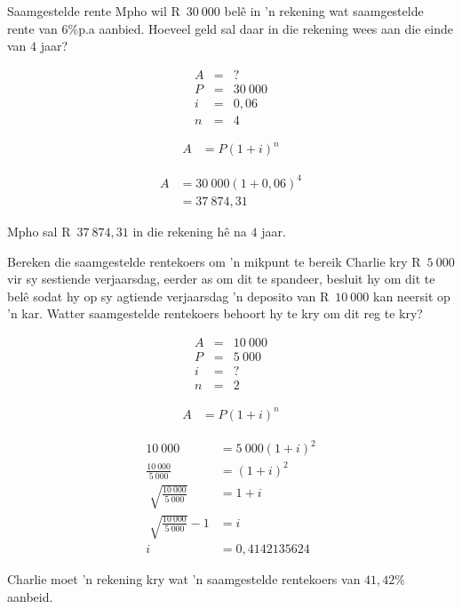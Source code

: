 \begin{wex}{Saamgestelde rente}{
    Mpho wil R~$30~000$ bel\^e in 'n rekening wat saamgestelde rente van $6\%$p.a aanbied. Hoeveel geld sal daar in die rekening wees aan die einde van $4$ jaar?}{
    
    \begin{eqnarray*}
	A &=& ?\\
	P &=& 30~000\\
	i &=& 0,06\\
	n &=& 4
    \end{eqnarray*}

    \begin{align*}
	A &= P(1 + i)^n
    \end{align*}

    \begin{align*}
	A &= 30~000(1 + 0,06)^4\\
	  &= 37~874,31
    \end{align*}

    Mpho sal R~$37~874,31$ in die rekening h\^e na $4$ jaar.
    }
\end{wex}


\begin{wex}{Bereken die saamgestelde rentekoers om 'n mikpunt te bereik}{
    Charlie kry R~$5~000$ vir sy sestiende verjaarsdag, eerder as om dit te spandeer, besluit hy om dit te bel\^e sodat hy op sy agtiende verjaarsdag 'n deposito van R~$10~000$ kan neersit op 'n kar. Watter saamgestelde rentekoers behoort hy te kry om dit reg te kry?}{
    
    \begin{eqnarray*}
	A &=& 10~000\\
	P &=& 5~000\\
	i &=& ?\\
	n &=& 2
    \end{eqnarray*}

    \begin{align*}
	A &= P(1 + i)^n
    \end{align*}

    \begin{align*}
	10~000 &= 5~000(1 + i)^2\\
	\frac{10~000}{5~000}&= (1 +i)^2\\
	\sqrt[]{\frac{10~000}{5~000}} &= 1 + i\\
	\sqrt[]{\frac{10~000}{5~000}} - 1 &= i\\
	i &= 0,4142135624
    \end{align*}

    Charlie moet 'n rekening kry wat 'n saamgestelde rentekoers van $41,42\%$ aanbeid.
    }
\end{wex}


